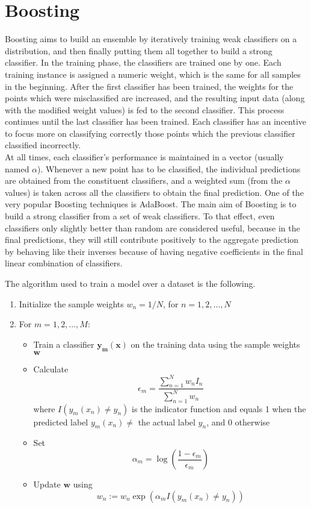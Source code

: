 \section{Boosting}
Boosting aims to build an ensemble by iteratively training weak classifiers on a distribution, and then finally putting them all together to build a strong classifier. In the training phase, the classifiers are trained one by one. Each training instance is assigned a numeric weight, which is the same for all samples in the beginning. After the first classifier has been trained, the weights for the points which were misclassified are increased, and the resulting input data (along with the modified weight values) is fed to the second classifier. This process continues until the last classifier has been trained. Each classifier has an incentive to focus more on classifying correctly those points which the previous classifier classified incorrectly.\\

At all times, each classifier's performance is maintained in a vector (usually named $\alpha$). Whenever a new point has to be classified, the individual predictions are obtained from the constituent classifiers, and a weighted sum (from the $\alpha$ values) is taken across all the classifiers to obtain the final prediction. One of the very popular Boosting techniques is AdaBoost. The main aim of Boosting is to build a strong classifier from a set of weak classifiers. To that effect, even classifiers only slightly better than random are considered useful, because in the final predictions, they will still contribute positively to the aggregate prediction by behaving like their inverses because of having negative coefficients in the final linear combination of classifiers.

The algorithm used to train a model over a dataset is the following.

\begin{enumerate}
    \item{Initialize the sample weights $w_n = 1/N$, for $n = 1, 2, ..., N$}
    \item{
    For $m = 1, 2, ..., M$:
    \begin{itemize}
        \item{Train a classifier $\mathbf{y_m(x)}$ on the training data using the sample weights $\mathbf{w}$}
        \item{Calculate $$\epsilon_m = \frac{\displaystyle \sum_{n = 1}^{N} w_n I_n}{\displaystyle \sum_{n = 1}^{N} w_n}$$ where $I(y_m(x_n) \neq y_n)$ is the indicator function and equals 1 when the predicted label $y_m(x_n) \neq$ the actual label $y_n$, and 0 otherwise}
        \item{Set $$\alpha_m = \log(\frac{1 - \epsilon_m}{\epsilon_m})$$}
        \item{Update $\mathbf{w}$ using $$w_n := w_n \exp(\alpha_m I(y_m(x_n) \neq y_n))$$}
    \end{itemize}
    }
\end{enumerate}

